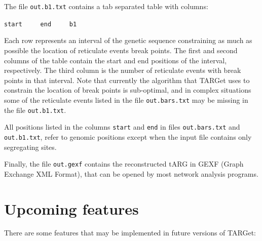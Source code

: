 \documentclass[12pt]{article}
\begin{document}
The file \texttt{out.b1.txt} contains a tab separated table with columns:

\texttt{start\ \ \ \ \ end\ \ \ \ \ b1}

\noindent Each row represents an interval of the genetic sequence constraining as much as possible the location of reticulate events break points. The first and second columns of the table contain the start and end positions of the interval, respectively. The third column is the number of reticulate events with break points in that interval. Note that currently the algorithm that TARGet uses to constrain the location of break points is sub-optimal, and in complex situations some of the reticulate events listed in the file \texttt{out.bars.txt} may be missing in the file \texttt{out.b1.txt}.

All positions listed in the columns \texttt{start} and \texttt{end} in files \texttt{out.bars.txt} and \texttt{out.b1.txt}, refer to genomic positions except when the input file contains only segregating sites.

Finally, the file \texttt{out.gexf} contains the reconstructed tARG in GEXF (Graph Exchange XML Format), that can be opened by most network analysis programs.

\section{Upcoming features}

There are some features that may be implemented in future versions of TARGet:
\end{document}
